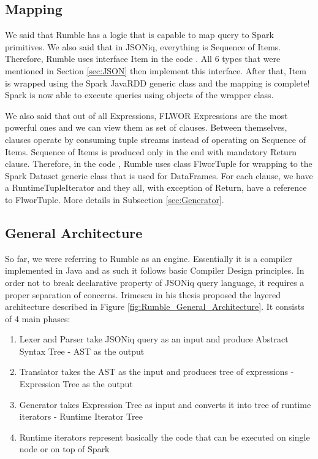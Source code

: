 \subsection{Mapping}
\label{sec:RumbleMapping}
We said that Rumble has a logic that is capable to map query to Spark primitives. We also said that in JSONiq, everything is Sequence of Items. Therefore, Rumble uses interface Item in the code \cite{RumbleRepository}. All 6 types that were mentioned in Section \ref{sec:JSON} then implement this interface. After that, Item is wrapped using the Spark JavaRDD generic class and the mapping is complete! Spark is now able to execute queries using objects of the wrapper class.

We also said that out of all Expressions, FLWOR Expressions are the most powerful ones and we can view them as set of clauses. Between themselves, clauses operate by consuming tuple streams instead of operating on Sequence of Items. Sequence of Items is produced only in the end with mandatory Return clause. Therefore, in the code \cite{RumbleRepository}, Rumble uses class FlworTuple for wrapping to the Spark Dataset generic class that is used for DataFrames. For each clause, we have a RuntimeTupleIterator and they all, with exception of Return, have a reference to FlworTuple. More details in Subsection \ref{sec:Generator}.

\subsection{General Architecture}
\label{sec:RumbleArchitecture}
So far, we were referring to Rumble as an engine. Essentially it is a compiler implemented in Java and as such it follows basic Compiler Design principles. In order not to break declarative property of JSONiq query language, it requires a proper separation of concerns. Irimescu in his thesis \cite{RumbleThesis} proposed the layered architecture described in Figure \ref{fig:Rumble_General_Architecture}. It consists of 4 main phases:
\begin{enumerate}
	\item Lexer and Parser take JSONiq query as an input and produce Abstract Syntax Tree - AST as the output 
	\item Translator takes the AST as the input and produces tree of expressions - Expression Tree as the output
	\item Generator takes Expression Tree as input and converts it into tree of runtime iterators - Runtime Iterator Tree
	\item Runtime iterators represent basically the code that can be executed on single node or on top of Spark
\end{enumerate} 

